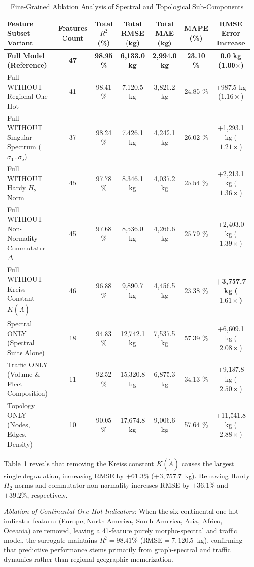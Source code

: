 \documentclass[journal]{IEEEtran}
\begin{document}
\begin{table}[htbp]
\caption{Fine-Grained Ablation Analysis of Spectral and Topological Sub-Components}
\label{tab:fine_ablation}
\centering
\begin{tabular}{lcccccc}
\toprule
Feature Subset Variant & Features Count & Total $R^2$ (\%) & Total RMSE (kg) & Total MAE (kg) & MAPE (\%) & RMSE Error Increase \\
\midrule
\textbf{Full Model (Reference)} & \textbf{47} & \textbf{98.95 \%} & \textbf{6,133.0 kg} & \textbf{2,994.0 kg} & \textbf{23.10 \%} & \textbf{0.0 kg (1.00$\times$)} \\
Full WITHOUT Regional One-Hot & 41 & 98.41 \% & 7,120.5 kg & 3,820.2 kg & 24.85 \% & +987.5 kg ($1.16\times$) \\
Full WITHOUT Singular Spectrum ($\sigma_1..\sigma_5$) & 37 & 98.24 \% & 7,426.1 kg & 4,242.1 kg & 26.02 \% & +1,293.1 kg ($1.21\times$) \\
Full WITHOUT Hardy $H_2$ Norm & 45 & 97.78 \% & 8,346.1 kg & 4,037.2 kg & 25.54 \% & +2,213.1 kg ($1.36\times$) \\
Full WITHOUT Non-Normality Commutator $\Delta$ & 45 & 97.68 \% & 8,536.0 kg & 4,266.6 kg & 25.79 \% & +2,403.0 kg ($1.39\times$) \\
Full WITHOUT Kreiss Constant $K(\tilde{A})$ & 46 & 96.88 \% & 9,890.7 kg & 4,456.5 kg & 23.38 \% & \textbf{+3,757.7 kg ($1.61\times$)} \\
\midrule
Spectral ONLY (Spectral Suite Alone) & 18 & 94.83 \% & 12,742.1 kg & 7,537.5 kg & 57.39 \% & +6,609.1 kg ($2.08\times$) \\
Traffic ONLY (Volume \& Fleet Composition) & 11 & 92.52 \% & 15,320.8 kg & 6,875.3 kg & 34.13 \% & +9,187.8 kg ($2.50\times$) \\
Topology ONLY (Nodes, Edges, Density) & 10 & 90.05 \% & 17,674.8 kg & 9,006.6 kg & 57.64 \% & +11,541.8 kg ($2.88\times$) \\
\bottomrule
\end{tabular}
\end{table}

Table~\ref{tab:fine_ablation} reveals that removing the Kreiss constant $K(\tilde{A})$ causes the largest single degradation, increasing RMSE by $+61.3\%$ ($+3,757.7$~kg). Removing Hardy $H_2$ norms and commutator non-normality increases RMSE by $+36.1\%$ and $+39.2\%$, respectively. 

\textit{Ablation of Continental One-Hot Indicators}: When the six continental one-hot indicator features (Europe, North America, South America, Asia, Africa, Oceania) are removed, leaving a 41-feature purely morpho-spectral and traffic model, the surrogate maintains $R^2 = 98.41\%$ ($\text{RMSE} = 7,120.5$~kg), confirming that predictive performance stems primarily from graph-spectral and traffic dynamics rather than regional geographic memorization.
\end{document}
